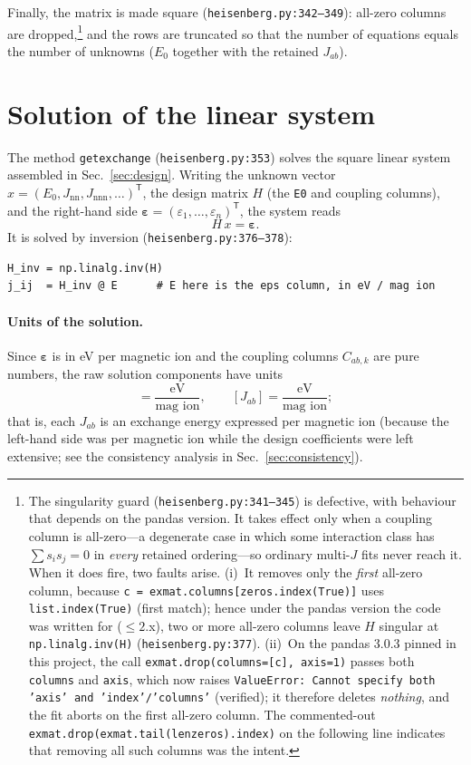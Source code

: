 \documentclass[11pt]{article}
\newcommand{\code}[1]{\texttt{\def\_{\textunderscore\allowbreak}#1}}
\begin{document}
Finally, the matrix is made square (\code{heisenberg.py:342--349}): all-zero
columns are dropped,\footnote{The singularity guard (\code{heisenberg.py:341--345})
is defective, with behaviour that depends on the pandas version. It takes effect
only when a coupling column is all-zero---a degenerate case in which some
interaction class has $\sum s_i s_j = 0$ in \emph{every} retained ordering---so
ordinary multi-$J$ fits never reach it. When it does fire, two faults arise.
(i)~It removes only the \emph{first} all-zero column, because
\code{c = ex\_mat.columns[zeros.index(True)]} uses \code{list.index(True)} (first
match); hence under the pandas version the code was written for ($\le 2$.x), two
or more all-zero columns leave $H$ singular at \code{np.linalg.inv(H)}
(\code{heisenberg.py:377}). (ii)~On the pandas 3.0.3 pinned in this project, the
call \code{ex\_mat.drop(columns=[c], axis=1)} passes both \code{columns} and
\code{axis}, which now raises
\code{ValueError: Cannot specify both 'axis' and 'index'/'columns'} (verified);
it therefore deletes \emph{nothing}, and the fit aborts on the first all-zero
column. The commented-out \code{ex\_mat.drop(ex\_mat.tail(len\_zeros).index)} on
the following line indicates that removing all such columns was the intent.} and
the rows are truncated so that the number of equations equals the number of
unknowns ($E_0$ together with the retained $J_{ab}$).

\section{Solution of the linear system}
\label{sec:fit}

The method \code{get\_exchange} (\code{heisenberg.py:353}) solves the square
linear system assembled in Sec.~\ref{sec:design}. Writing the unknown vector
$x = (E_0, J_{\mathrm{nn}}, J_{\mathrm{nnn}}, \dots)^{\mathsf T}$, the design
matrix $H$ (the \code{E0} and coupling columns), and the right-hand side
$\boldsymbol{\varepsilon} = (\varepsilon_1, \dots, \varepsilon_n)^{\mathsf T}$,
the system reads
\begin{equation}
  H\, x = \boldsymbol{\varepsilon} .
\end{equation}
It is solved by inversion (\code{heisenberg.py:376--378}):
\begin{lstlisting}
H_inv = np.linalg.inv(H)
j_ij  = H_inv @ E      # E here is the eps column, in eV / mag ion
\end{lstlisting}

\paragraph{Units of the solution.} Since $\boldsymbol{\varepsilon}$ is in
eV per magnetic ion and the coupling columns $C_{ab,k}$ are pure numbers, the raw
solution components have units
\begin{equation}
  [E_0] = \frac{\text{eV}}{\text{mag ion}},
  \qquad
  [J_{ab}] = \frac{\text{eV}}{\text{mag ion}} ;
\end{equation}
that is, each $J_{ab}$ is an exchange energy expressed per magnetic ion (because
the left-hand side was per magnetic ion while the design coefficients were left
extensive; see the consistency analysis in Sec.~\ref{sec:consistency}).
\end{document}

